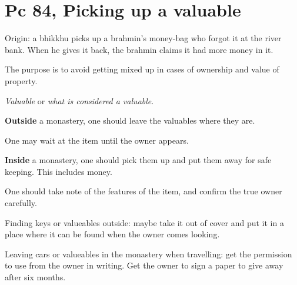 \section{Pc 84, Picking up a valuable}

Origin: a bhikkhu picks up a brahmin's money-bag who forgot it at the
river bank. When he gives it back, the brahmin claims it had more money
in it.

The purpose is to avoid getting mixed up in cases of ownership and value
of property.

\emph{Valuable} or \emph{what is considered a valuable}.

\textbf{Outside} a monastery, one should leave the valuables where they
are.

One may wait at the item until the owner appears.

\textbf{Inside} a monastery, one should pick them up and put them away
for safe keeping. This includes money.

One should take note of the features of the item, and confirm the true
owner carefully.

Finding keys or valueables outside: maybe take it out of cover and put
it in a place where it can be found when the owner comes looking.

Leaving cars or valueables in the monastery when travelling: get the
permission to use from the owner in writing. Get the owner to sign a
paper to give away after six months.

